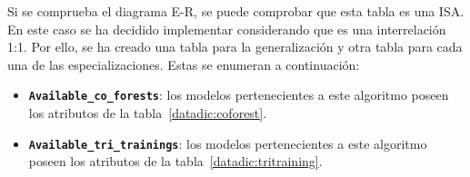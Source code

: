 Si se comprueba el diagrama E-R, se puede comprobar que esta tabla es una ISA. En este caso se ha decidido implementar considerando que es una interrelación 1:1. Por ello, se ha creado una tabla para la generalización y otra tabla para cada una de las especializaciones. Estas se enumeran a continuación:

\begin{itemize}
	\item \textbf{\texttt{Available\_co\_forests}}: los modelos pertenecientes a este algoritmo poseen los atributos de la tabla~\ref{datadic:coforest}.

	\begin{table}
		\caption[Diccionario de datos: Available\_co\_forests]{Diccionario de datos: tabla correspondiente a la clase \texttt{Available\_co\_forests}.}
		\label{datadic:coforest}
	\end{table}

	\item \textbf{\texttt{Available\_tri\_trainings}}: los modelos pertenecientes a este algoritmo poseen los atributos de la tabla~\ref{datadic:tritraining}.


\end{itemize}

